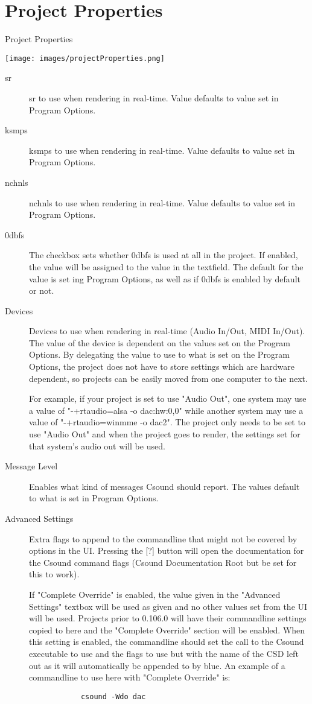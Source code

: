 \section{Project Properties}\label{projectProperties}

Project Properties

\texttt{[image: images/projectProperties.png]}

\begin{description}
\item[sr]
sr to use when rendering in real-time. Value defaults to value set in
Program Options.
\item[ksmps]
ksmps to use when rendering in real-time. Value defaults to value set in
Program Options.
\item[nchnls]
nchnls to use when rendering in real-time. Value defaults to value set
in Program Options.
\item[0dbfs]
The checkbox sets whether 0dbfs is used at all in the project. If
enabled, the value will be assigned to the value in the textfield. The
default for the value is set ing Program Options, as well as if 0dbfs is
enabled by default or not.
\item[Devices]
Devices to use when rendering in real-time (Audio In/Out, MIDI In/Out).
The value of the device is dependent on the values set on the Program
Options. By delegating the value to use to what is set on the Program
Options, the project does not have to store settings which are hardware
dependent, so projects can be easily moved from one computer to the
next.

For example, if your project is set to use "Audio Out", one system may
use a value of "-+rtaudio=alsa -o dac:hw:0,0" while another system may
use a value of "-+rtaudio=winmme -o dac2". The project only needs to be
set to use "Audio Out" and when the project goes to render, the settings
set for that system's audio out will be used.
\item[Message Level]
Enables what kind of messages Csound should report. The values default
to what is set in Program Options.
\item[Advanced Settings]
Extra flags to append to the commandline that might not be covered by
options in the UI. Pressing the {[}?{]} button will open the
documentation for the Csound command flags (Csound Documentation Root
but be set for this to work).

If "Complete Override" is enabled, the value given in the "Advanced
Settings" textbox will be used as given and no other values set from the
UI will be used. Projects prior to 0.106.0 will have their commandline
settings copied to here and the "Complete Override" section will be
enabled. When this setting is enabled, the commandline should set the
call to the Csound executable to use and the flags to use but with the
name of the CSD left out as it will automatically be appended to by
blue. An example of a commandline to use here with "Complete Override"
is:

\begin{verbatim}
            csound -Wdo dac
          
\end{verbatim}
\end{description}

